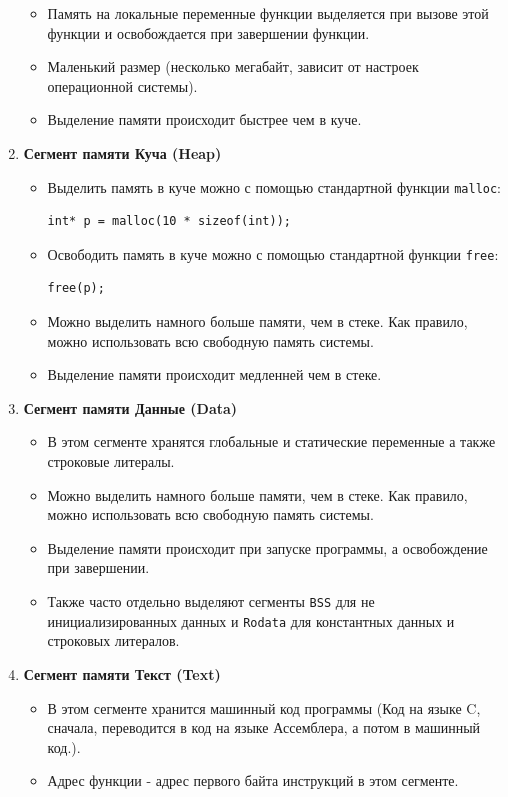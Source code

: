 \documentclass[10pt]{article}
\begin{document}
\begin{multicols}{2}
\begin{enumerate}
\begin{itemize}
\item Память на локальные переменные функции выделяется при вызове этой функции и освобождается при завершении функции.
\item Маленький размер (несколько мегабайт, зависит от настроек операционной системы).
\item Выделение памяти происходит быстрее чем в куче.
\end{itemize}
\item \textbf{Сегмент памяти Куча (Heap)}
\begin{itemize}
\item Выделить память в куче можно с помощью стандартной функции \texttt{malloc}:
\begin{lstlisting}
int* p = malloc(10 * sizeof(int));
\end{lstlisting}
\item Освободить память в куче можно с помощью стандартной функции \texttt{free}:
\begin{lstlisting}
free(p);
\end{lstlisting}
\item Можно выделить намного больше памяти, чем в стеке.
Как правило, можно использовать всю свободную память системы.
\item Выделение памяти происходит медленней чем в стеке.
\end{itemize}
\end{enumerate}
\end{multicols}

\begin{enumerate}
\setcounter{enumi}{2}

\item \textbf{Сегмент памяти Данные (Data)}
\begin{itemize}
\item В этом сегменте хранятся глобальные и статические переменные а также строковые литералы.
\item Можно выделить намного больше памяти, чем в стеке.
Как правило, можно использовать всю свободную память системы.
\item Выделение памяти происходит при запуске программы, а освобождение при завершении.
\item Также часто отдельно выделяют сегменты \texttt{BSS} для не инициализированных данных и \texttt{Rodata} для константных данных и строковых литералов.
\end{itemize}

\item \textbf{Сегмент памяти Текст (Text)}
\begin{itemize}
\item В этом сегменте хранится машинный код программы (Код на языке C, сначала, переводится в код на языке Ассемблера, а потом в машинный код.).
\item Адрес функции - адрес первого байта инструкций в этом сегменте.
\end{itemize}
\end{enumerate}
\end{document}
